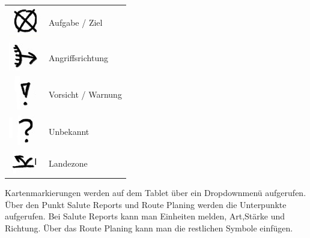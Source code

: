 \begin{longtable}{p{3cm} p{15cm}}
	\includegraphics[scale=1]{./Grafiken/KarteUndMarkierungen/Aufgabe.png}		&		Aufgabe / Ziel \\
	\includegraphics[scale=1]{./Grafiken/KarteUndMarkierungen/Angriffsrichtung.png}	& 		Angriffsrichtung \\
	\includegraphics[scale=1]{./Grafiken/KarteUndMarkierungen/Achtung.png}		&		Vorsicht / Warnung \\
	\includegraphics[scale=1]{./Grafiken/KarteUndMarkierungen/FrageUnbekannt.png}	& 		Unbekannt \\
	\includegraphics[scale=1]{./Grafiken/KarteUndMarkierungen/LZ.png}			&		Landezone
\end{longtable}

\newpage

	Kartenmarkierungen werden auf dem Tablet über ein Dropdownmenü aufgerufen. Über den Punkt Salute Reports und Route Planing werden die Unterpunkte aufgerufen. Bei Salute Reports kann man Einheiten melden, Art,Stärke und Richtung. Über das Route Planing kann man die restlichen Symbole einfügen.

